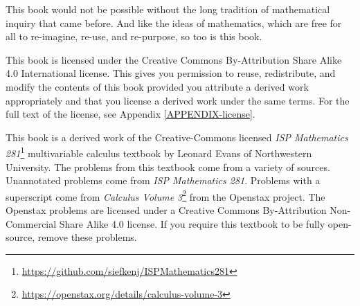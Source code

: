 This book would not be possible without the long tradition
of mathematical inquiry that came before.  And like the
ideas of mathematics, which are free for all to re-imagine,
re-use, and re-purpose, so too is this book.

This book is licensed under the Creative Commons By-Attribution
Share Alike 4.0 International license.  This gives you permission
to reuse, redistribute, and modify the contents of this book provided
you attribute a derived work appropriately and that you
license a derived work under the same terms.  For the full text
of the license, see Appendix \ref{APPENDIX-license}.

This book is a derived work of the Creative-Commons licensed
\emph{ISP Mathematics 281}\footnote{
\url{https://github.com/siefkenj/ISPMathematics281}
} multivariable calculus textbook by
Leonard Evans of Northwestern University.  The problems from this textbook
come from a variety of sources.  Unannotated problems come from \emph{ISP Mathematics 281}.
Problems with a superscript \openstax come from \emph{Calculus Volume 3}\footnote{
\url{https://openstax.org/details/calculus-volume-3}
} from the Openstax
project.  The Openstax problems are licensed under a Creative Commons By-Attribution
Non-Commercial Share Alike 4.0 license.  If you require this textbook to be fully open-source,
remove these problems.
